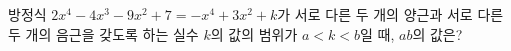 방정식 $2x^4-4x^3-9x^2+7=-x^4+3x^2+k$가 서로 다른 두 개의 양근과 서로 다른 두 개의 음근을 갖도록 하는 실수 $k$의 값의 범위가 $a<k<b$일 때, $ab$의 값은?
